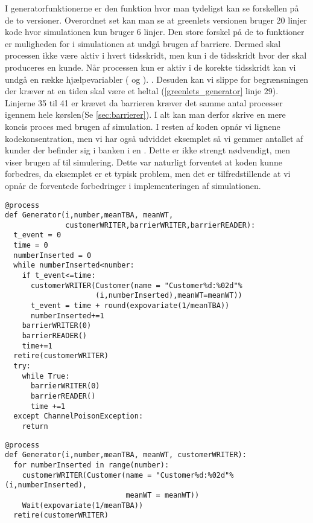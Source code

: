 I generatorfunktionerne er den funktion hvor man tydeligst kan  se forskellen på de to versioner. Overordnet set kan man se at greenlets versionen bruger 20 linjer kode hvor simulationen kun bruger 6 linjer. Den store forskel på de to funktioner er muligheden for i simulationen  at undgå brugen af barriere. Dermed skal processen ikke være aktiv i hvert tidsskridt, men kun i de tidsskridt hvor der skal produceres en kunde. Når processen kun er aktiv i de korekte tidsskridt kan vi undgå en række hjælpevariabler ( og ). . Desuden kan vi slippe for begrænsningen der kræver at en tiden skal være et heltal (\cref{greenlets_generator} linje 29). Linjerne 35 til 41 er krævet da barrieren kræver det samme antal processer igennem hele kørslen(Se \cref{sec:barrierer}). I alt kan man derfor skrive en mere koncis proces med brugen af simulation. I resten af koden opnår vi lignene kodekonsentration, men vi har også udviddet eksemplet så vi gemmer antallet af kunder der befinder sig i banken i en . Dette er ikke strengt nødvendigt, men viser brugen af  til simulering. Dette var naturligt forventet at koden kunne forbedres, da eksemplet er et typisk \des problem, men det er tilfredstillende at vi opnår de forventede forbedringer i implementeringen af simulationen.
\begin{lstlisting}[firstnumber=21, label=fig:green:generator, caption=Generatorprocessen for Greenlets versionen]
@process
def Generator(i,number,meanTBA, meanWT,
              customerWRITER,barrierWRITER,barrierREADER):
  t_event = 0
  time = 0
  numberInserted = 0
  while numberInserted<number:
    if t_event<=time:
      customerWRITER(Customer(name = "Customer%d:%02d"%
                     (i,numberInserted),meanWT=meanWT))
      t_event = time + round(expovariate(1/meanTBA))
      numberInserted+=1
    barrierWRITER(0)
    barrierREADER()
    time+=1
  retire(customerWRITER)
  try:
    while True:
      barrierWRITER(0)
      barrierREADER()
      time +=1
  except ChannelPoisonException: 
    return
\end{lstlisting}
\begin{lstlisting}[firstnumber=20, label=fig:sim:generator, caption=Generatorprocessen for Simulationsversionen]
@process
def Generator(i,number,meanTBA, meanWT, customerWRITER):
  for numberInserted in range(number):
    customerWRITER(Customer(name = "Customer%d:%02d"%(i,numberInserted),
                            meanWT = meanWT))
    Wait(expovariate(1/meanTBA))
  retire(customerWRITER)
\end{lstlisting}

